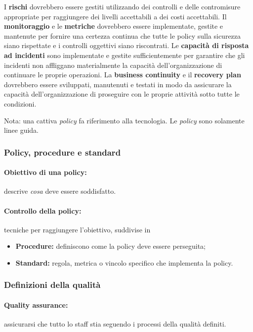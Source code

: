 I \textbf{rischi} dovrebbero essere gestiti utilizzando dei controlli e delle 
contromisure appropriate per raggiungere dei livelli accettabili a dei costi 
accettabili. Il \textbf{monitoraggio} e le \textbf{metriche} dovrebbero essere 
implementate, gestite e mantenute per fornire una certezza continua che tutte 
le policy sulla sicurezza siano rispettate e i controlli oggettivi siano 
riscontrati. Le \textbf{capacità di risposta ad incidenti} sono implementate e 
gestite sufficientemente per garantire che gli incidenti non affliggano 
materialmente la capacità dell'organizzazione di continuare le proprie 
operazioni. 
La \textbf{business continuity} e il \textbf{recovery plan} dovrebbero essere 
sviluppati, manutenuti e testati in modo da assicurare la capacità 
dell'organizzazione di proseguire con le proprie attività sotto tutte le 
condizioni.


Nota: una cattiva \textit{policy} fa riferimento alla tecnologia. Le
\textit{policy} sono solamente linee guida.

\subsubsection{Policy, procedure e standard}

\paragraph*{Obiettivo di una policy:} descrive \textit{cosa} deve essere 
soddisfatto.

\paragraph*{Controllo della policy:} tecniche per raggiungere l'obiettivo, 
suddivise in
\begin{itemize}
  \item \textbf{Procedure:} definiscono come la policy deve essere perseguita;
  \item \textbf{Standard:} regola, metrica o vincolo specifico che implementa 
  la policy.
\end{itemize}

\subsubsection{Definizioni della qualità}

\paragraph*{Quality assurance:} assicurarsi che tutto lo staff stia seguendo i 
processi della qualità definiti.

